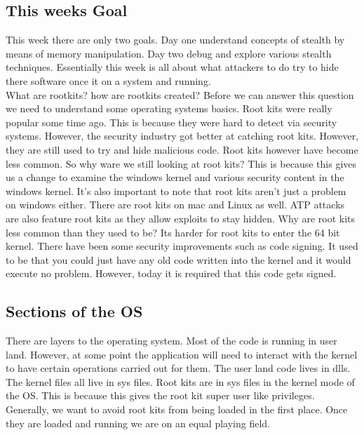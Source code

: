 \documentclass[letterpaper, onecolumn,10pt]{IEEEtran}
\begin{document}
		    \subsection{This weeks Goal}
		    This week there are only two goals. Day one understand concepts of stealth by means of memory manipulation. Day two debug and explore various stealth techniques. Essentially this week is all about what attackers to do try to hide there software once it on a system and running.\\
		    
		    What are rootkits? how are rootkits created? Before we can answer this question we need to understand some operating systems basics. Root kits were really popular some time ago. This is because they were hard to detect via security systems. However, the security industry got better at catching root kits. However, they are still used to try and hide malicious code. Root kits however have become less common. So why ware we still looking at root kits? This is because this gives us a change to examine the windows kernel and various security content in the windows kernel. It's also important to note that root kits aren't just a problem on windows either. There are root kits on mac and Linux as well. ATP attacks are also feature root kits as they allow exploits to stay hidden. Why are root kits less common than they used to be? Its harder for root kits to enter the 64 bit kernel. There have been some security improvements such as code signing. It used to be that you could just have any old code written into the kernel and it would execute no problem. However, today it is required that this code gets signed.\\
		    
		    \subsection{Sections of the OS}
		    There are layers to the operating system. Most of the code is running in user land. However, at some point the application will need to interact with the kernel to have certain operations carried out for them. The user land code lives in dlls. The kernel files all live in sys files. Root kits are in sys files in the kernel mode of the OS. This is because this gives the root kit super user like privileges. Generally, we want to avoid root kits from being loaded in the first place. Once they are loaded and running we are on an equal playing field.\\
		    
\end{document}
